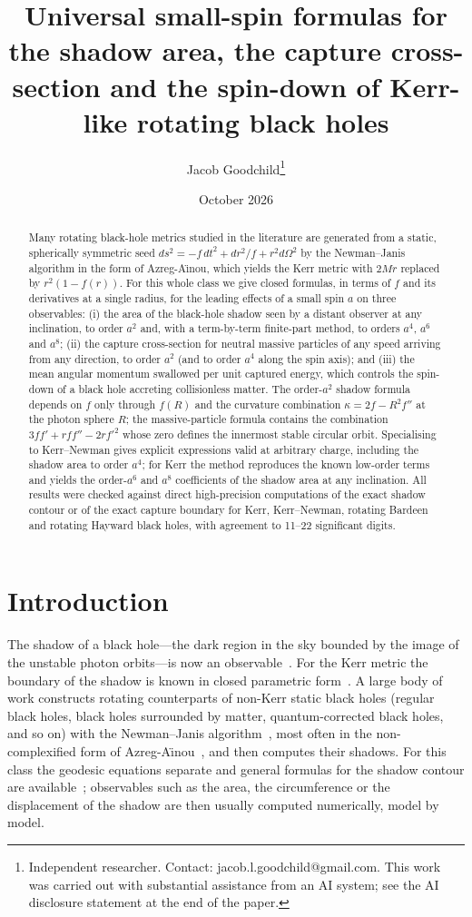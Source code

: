 \documentclass[11pt,a4paper]{article}
\title{Universal small-spin formulas for the shadow area, the capture cross-section and the spin-down of Kerr-like rotating black holes}
\author{Jacob Goodchild\thanks{Independent researcher. Contact: jacob.l.goodchild@gmail.com.
This work was carried out with substantial assistance from an AI system; see the
AI disclosure statement at the end of the paper.}}
\date{October 2026}
\theoremstyle{remark}
\numberwithin{equation}{section}
\begin{document}
\maketitle

\begin{abstract}
Many rotating black-hole metrics studied in the literature are generated from a static,
spherically symmetric seed $ds^2=-f\,dt^2+dr^2/f+r^2d\Omega^2$ by the Newman--Janis algorithm in the
form of Azreg-A\"{\i}nou, which yields the Kerr metric with $2Mr$ replaced by $r^2(1-f(r))$. For this
whole class we give closed formulas, in terms of $f$ and its derivatives at a single radius, for
the leading effects of a small spin $a$ on three observables: (i) the area of the black-hole
shadow seen by a distant observer at any inclination, to order $a^2$ and, with a term-by-term
finite-part method, to orders $a^4$, $a^6$ and $a^8$; (ii) the capture cross-section for neutral
massive particles of any speed arriving from any direction, to order $a^2$ (and to order $a^4$
along the spin axis); and (iii) the mean angular momentum swallowed per unit captured energy, which
controls the spin-down of a black hole accreting collisionless matter. The order-$a^2$ shadow formula
depends on $f$ only through $f(R)$ and the curvature combination $\kappa=2f-R^2f''$ at the photon
sphere $R$; the massive-particle formula contains the combination $3ff'+rff''-2rf'^2$ whose zero
defines the innermost stable circular orbit. Specialising to Kerr--Newman gives explicit expressions valid at arbitrary charge, including the shadow area
to order $a^4$; for Kerr the method reproduces the known low-order terms and yields the order-$a^6$ and $a^8$
coefficients of the shadow area at any inclination. All results
were checked against direct high-precision computations of the exact shadow contour or of the
exact capture boundary for Kerr, Kerr--Newman, rotating Bardeen and rotating Hayward black holes,
with agreement to 11--22 significant digits.
\end{abstract}

\section{Introduction}

The shadow of a black hole---the dark region in the sky bounded by the image of the unstable
photon orbits---is now an observable~\cite{EHT2019}. For the Kerr metric the boundary of the shadow
is known in closed parametric form~\cite{Bardeen1973,Chandrasekhar1983}. A large body of work
constructs rotating counterparts of non-Kerr static black holes (regular black holes, black holes
surrounded by matter, quantum-corrected black holes, and so on) with the Newman--Janis
algorithm~\cite{NewmanJanis1965}, most often in the non-complexified form of
Azreg-A\"{\i}nou~\cite{AzregAinou2014}, and then computes their shadows. For this class the
geodesic equations separate and general formulas for the shadow contour are
available~\cite{Tsukamoto2018,Shaikh2019}; observables such as the area, the
circumference or the displacement of the shadow are then usually computed numerically, model by
model.
\end{document}
